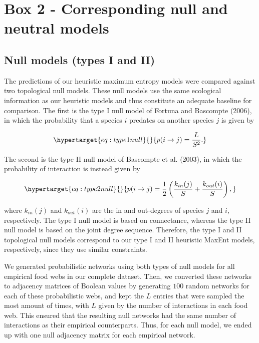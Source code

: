 \documentclass[10pt,oneside]{article}
\begin{document}
\hypertarget{box-2---corresponding-null-and-neutral-models}{%
\section{Box 2 - Corresponding null and neutral
models}\label{box-2---corresponding-null-and-neutral-models}}

\hypertarget{null-models-types-i-and-ii}{%
\subsection{Null models (types I and
II)}\label{null-models-types-i-and-ii}}

The predictions of our heuristic maximum entropy models were compared
against two topological null models. These null models use the same
ecological information as our heuristic models and thus constitute an
adequate baseline for comparison. The first is the type I null model of
Fortuna and Bascompte (2006), in which the probability that a species
\(i\) predates on another species \(j\) is given by

\begin{equation}\protect\hypertarget{eq:type1null}{}{p(i \rightarrow j) = \frac{L}{S^2}.}\label{eq:type1null}\end{equation}

The second is the type II null model of Bascompte et al. (2003), in
which the probability of interaction is instead given by

\begin{equation}\protect\hypertarget{eq:type2null}{}{p(i \rightarrow j) = \frac{1}{2} \left(\frac{k_{in}(j)}{S} + \frac{k_{out}(i)}{S}\right),}\label{eq:type2null}\end{equation}

where \(k_{in}(j)\) and \(k_{out}(i)\) are the in and out-degrees of
species \(j\) and \(i\), respectively. The type I null model is based on
connectance, whereas the type II null model is based on the joint degree
sequence. Therefore, the type I and II topological null models
correspond to our type I and II heuristic MaxEnt models, respectively,
since they use similar constraints.

We generated probabilistic networks using both types of null models for
all empirical food webs in our complete dataset. Then, we converted
these networks to adjacency matrices of Boolean values by generating
\(100\) random networks for each of these probabilistic webs, and kept
the \(L\) entries that were sampled the most amount of times, with \(L\)
given by the number of interactions in each food web. This ensured that
the resulting null networks had the same number of interactions as their
empirical counterparts. Thus, for each null model, we ended up with one
null adjacency matrix for each empirical network.
\end{document}
